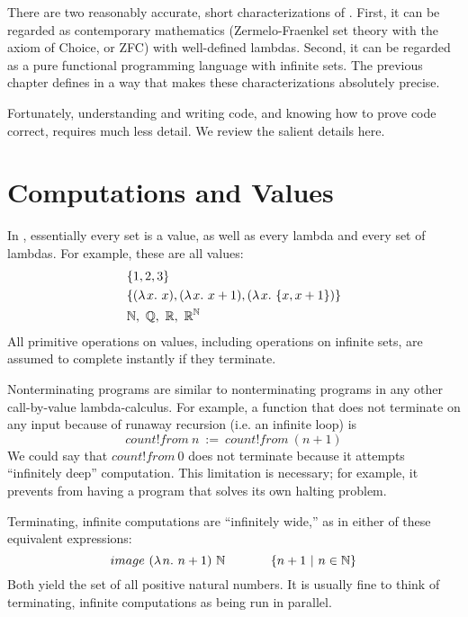 There are two reasonably accurate, short characterizations of \lzfclang.
First, it can be regarded as contemporary mathematics (Zermelo-Fraenkel set theory with the axiom of Choice, or ZFC) with well-defined lambdas.
Second, it can be regarded as a pure functional programming language with infinite sets.
The previous chapter defines \lzfclang in a way that makes these characterizations absolutely precise.

Fortunately, understanding and writing \lzfclang code, and knowing how to prove \lzfclang code correct, requires much less detail.
We review the salient details here.

\section{Computations and Values}

In \lzfclang, essentially every set is a value, as well as every lambda and every set of lambdas.
For example, these are all \lzfclang values:
\begin{equation}
\begin{aligned}
	&\{{1,2,3}\} \\
	&\{{(\lambda\mspace{2mu}{x}\ldotp\, x), (\lambda\mspace{2mu}{x}\ldotp\, x+1), (\lambda\mspace{2mu}{x}\ldotp\,\{{x,x+1}\})}\} \\
	&\mathbb{N},\ \mathbb{Q},\ \mathbb{R},\ \mathbb{R}^{\mathbb{N}}
\end{aligned}
\end{equation}
All primitive operations on values, including operations on infinite sets, are assumed to complete instantly if they terminate.

Nonterminating \lzfclang programs are similar to nonterminating programs in any other call-by-value lambda-calculus.
For example, a function that does not terminate on any input because of runaway recursion (i.e. an infinite loop) is
\begin{equation}
	count!from~n\ :=\ count!from~(n+1)
\end{equation}
We could say that $count!from~0$ does not terminate because it attempts ``infinitely deep'' computation.
This limitation is necessary; for example, it prevents \lzfclang from having a program that solves its own halting problem.

Terminating, infinite computations are ``infinitely wide,'' as in either of these equivalent expressions:
\begin{equation}
	image~(\lambda\mspace{2mu}{n}\ldotp\, n+1)~\mathbb{N} \hspace{0.5in} \lbrace {n+1} \ \lvert\ {n \in \mathbb{N}} \rbrace
\end{equation}
Both yield the set of all positive natural numbers.
It is usually fine to think of terminating, infinite computations as being run in parallel.

